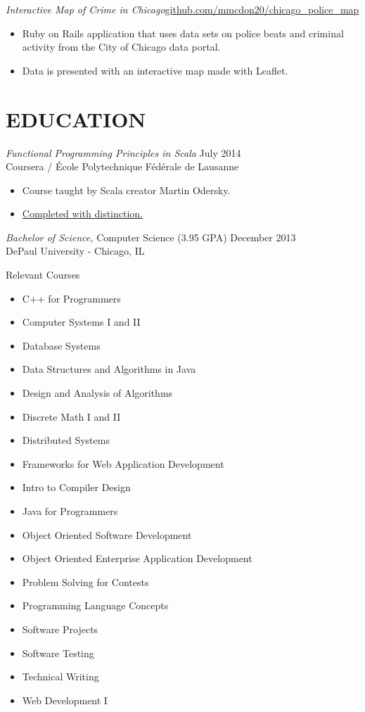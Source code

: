 \documentclass[margin]{res}
\begin{document}
\begin{resume}
  {\sl Interactive Map of Crime in Chicago}\hfill \href{http://github.com/mmcdon20/chicago\_police\_map}{github.com/mmcdon20/chicago\_police\_map}
  \begin{itemize} \itemsep -2pt
    \item Ruby on Rails application that uses data sets on police beats and criminal activity from the City of Chicago data portal.
    \item Data is presented with an interactive map made with Leaflet.
  \end{itemize}
                
\section{EDUCATION} 
  {\sl Functional Programming Principles in Scala} \hfill  July 2014 \\
  Coursera / École Polytechnique Fédérale de Lausanne
  \begin{itemize} \itemsep -2pt 
    \item Course taught by Scala creator Martin Odersky.
    \item \href{https://github.com/mmcdon20/coursera/blob/master/Functional%20Programming%20Principles%202014.pdf?raw=true}{Completed with distinction.} 
  \end{itemize}

  {\sl Bachelor of Science,} Computer Science (3.95 GPA) \hfill December 2013 \\
  DePaul University - Chicago, IL 
  \begin{multicols}{2} \centerline{Relevant Courses}
    \begin{itemize} \itemsep -2pt 
      \item C++ for Programmers
      \item Computer Systems I and II
      \item Database Systems
      \item Data Structures and Algorithms in Java
      \item Design and Analysis of Algorithms
      \item Discrete Math I and II
      \item Distributed Systems
      \item Frameworks for Web Application Development
      \item Intro to Compiler Design
      \item Java for Programmers
      \item Object Oriented Software Development
      \item Object Oriented Enterprise Application Development
      \item Problem Solving for Contests
      \item Programming Language Concepts
      \item Software Projects
      \item Software Testing
      \item Technical Writing
      \item Web Development I
    \end{itemize}
  \end{multicols}


\end{resume}
\end{document}

